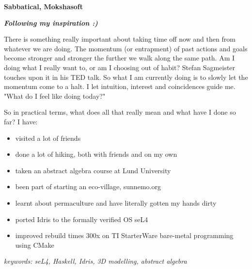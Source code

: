 \item[2016-] \textbf{Sabbatical, Mokshasoft}

\textit{\textbf{Following my inspiration :)}}

There is something really important about taking time off now and then from whatever we are doing. The momentum (or entrapment) of past actions and goals become stronger and stronger the further we walk along the same path. Am I doing what I really want to, or am I choosing out of habit? Stefan Sagmeister touches upon it in his TED talk. So what I am currently doing is to slowly let the momentum come to a halt. I let intuition, interest and coincidences guide me. "What do I feel like doing today?"

So in practical terms, what does all that really mean and what have I done so far? I have:

\begin{itemize}
    \item visited a lot of friends
    \item done a lot of hiking, both with friends and on my own
    \item taken an abstract algebra course at Lund University
    \item been part of starting an eco-village, sunnemo.org
    \item learnt about permaculture and have literally gotten my hands dirty
    \item ported Idris to the formally verified OS seL4
    \item improved rebuild times 300x on TI StarterWare bare-metal programming using CMake
\end{itemize}

\textit{keywords: seL4, Haskell, Idris, 3D modelling, abstract algebra}
